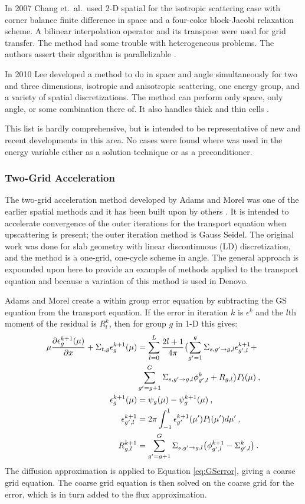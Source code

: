 In 2007 Chang et.\ al.\ used 2-D spatial \mg for the isotropic scattering case with corner balance finite difference in space and a four-color block-Jacobi relaxation scheme. A bilinear interpolation operator and its transpose were used for grid transfer. The method had some trouble with heterogeneous problems. The authors assert their algorithm is parallelizable \cite{Chang2007}.

In 2010 Lee developed a method to do \mg in space and angle simultaneously for two and three dimensions, isotropic and anisotropic scattering, one energy group, and a variety of spatial discretizations. The method can perform \mg only space, only angle, or some combination there of. It also handles thick and thin cells \cite{Lee2010}.

This list is hardly comprehensive, but is intended to be representative of new and recent developments in this area. No cases were found where \mg was used in the energy variable either as a solution technique or as a preconditioner. 

\subsubsection{Two-Grid Acceleration}
The two-grid acceleration method developed by Adams and Morel was one of the earlier spatial \mg methods and it has been built upon by others \cite{Adams1993}. It is intended to accelerate convergence of the outer iterations for the transport equation when upscattering is present; the outer iteration method is Gauss Seidel. The original work was done for slab geometry with linear discontinuous (LD) discretization, and the method is a one-grid, one-cycle scheme in angle. The general approach is expounded upon here to provide an example of \mg methods applied to the transport equation and because a variation of this method is used in Denovo. 

Adams and Morel create a within group error equation by subtracting the GS equation from the transport equation. If the error in iteration $k$ is $\epsilon^k$ and the $l$th moment of the residual is $R_l^k$, then for group $g$ in 1-D this gives:
%
\begin{align}
   \mu \frac{\partial \epsilon_{g}^{k+1}(\mu)}{\partial x} + \Sigma_{t,g} \epsilon_{g}^{k+1}(\mu) &= \sum_{l=0}^{L}\frac{2l+1}{4\pi} \bigl( \sum_{g'=1}^{g}\Sigma_{s,g' \to g, l} \epsilon_{g',l}^{k+1} 
   +  \label{eq:GSerror} \\
   &\sum_{g'=g+1}^{G}\Sigma_{s,g' \to g, l} \phi_{g',l}^{k} + R_{g,l}\bigr) P_{l}(\mu) \:, \nonumber \\
  \epsilon_{g}^{k+1}(\mu) &= \psi_{g}(\mu) - \psi_{g}^{k+1}(\mu) \:, \\
  \epsilon_{g',l}^{k+1} &= 2\pi \int_{-1}^{1}\epsilon_{g'}^{k+1}(\mu') P_{l}(\mu') d\mu' \:, \\ 
  R_{g,l}^{k+1} &=  \sum_{g'=g+1}^{G}\Sigma_{s,g' \to g, l} \bigl( \phi_{g',l}^{k+1} - \Sigma_{g',l}^{k} \bigr) \:.
\end{align}
%
The diffusion approximation is applied to Equation \eqref{eq:GSerror}, giving a coarse grid equation. The coarse grid equation is then solved on the coarse grid for the error, which is in turn added to the flux approximation. 

